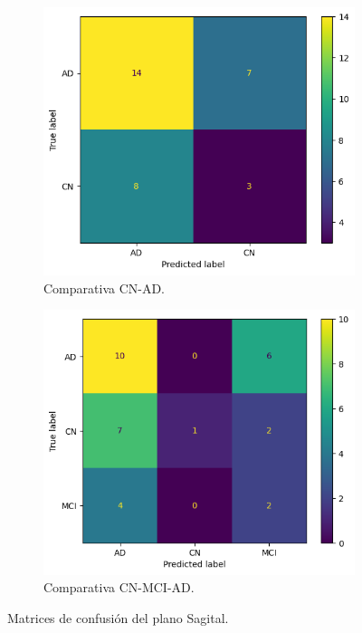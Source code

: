 \begin{figure}[H]
    \centering
    \begin{subfigure}{0.4\textwidth}
        \includegraphics[width=\textwidth]{./imgs/resultados/sagittal/CN_AD_cm_SAGITTAL}
        \caption{Comparativa CN-AD. }
        \label{fig:mc-sagital-cn-ad}
    \end{subfigure}
    \hspace*{\fill}
    \begin{subfigure}{0.4\textwidth}
        \includegraphics[width=\textwidth]{./imgs/resultados/sagittal/CN_MCI_AD_cm_SAGITTAL}
        \caption{Comparativa CN-MCI-AD. }
        \label{fig:mc-sagital-cn-mci-ad}
    \end{subfigure}
    \caption{Matrices de confusión del plano Sagital.} \label{fig:mc-sagittal}
\end{figure}

